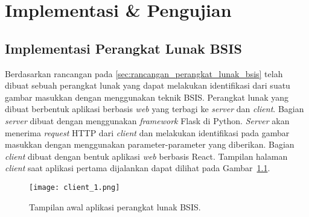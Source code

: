 \chapter{Implementasi \& Pengujian}

\section{Implementasi Perangkat Lunak BSIS}
Berdasarkan rancangan pada \ref{sec:rancangan_perangkat_lunak_bsis} telah dibuat sebuah perangkat lunak yang dapat melakukan identifikasi dari suatu gambar masukkan dengan menggunakan teknik BSIS. Perangkat lunak yang dibuat berbentuk aplikasi berbasis \textit{web} yang terbagi ke \textit{server} dan \textit{client}. Bagian \textit{server} dibuat dengan menggunakan \textit{framework} Flask di Python. \textit{Server} akan menerima \textit{request} HTTP dari \textit{client} dan melakukan identifikasi pada gambar masukkan dengan menggunakan parameter-parameter yang diberikan. Bagian \textit{client} dibuat dengan bentuk aplikasi \textit{web} berbasis React. Tampilan halaman \textit{client} saat aplikasi pertama dijalankan dapat dilihat pada Gambar~\ref{fig:client_1}.
\begin{figure}[H]
	\centering
	\texttt{[image: client\_1.png]}
	\caption{Tampilan awal aplikasi perangkat lunak BSIS.}
	\label{fig:client_1}
\end{figure}

